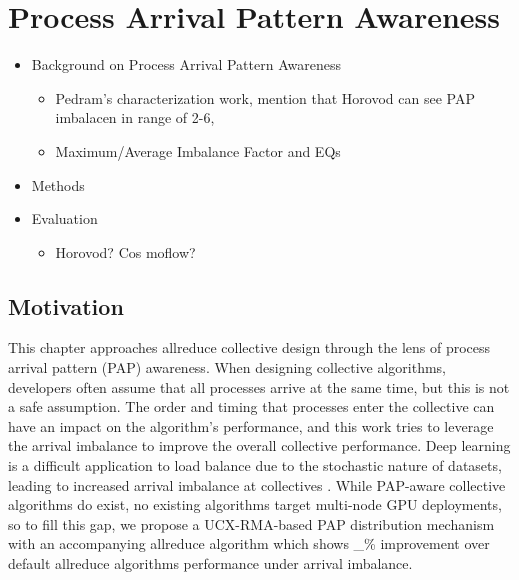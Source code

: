 
\chapter[Process Arrival Pattern Awareness]{Process Arrival Pattern Awareness}\label{ch:PAPAwareness}

\begin{itemize}
    \item Background on Process Arrival Pattern Awareness
    \begin{itemize}
        \item Pedram's characterization work, mention that Horovod can see PAP imbalacen in range of 2-6, \cite{Alizadeh2022PAPCollDL, Mohammadalizadehbakhtevari2021Thesis}
        \item Maximum/Average Imbalance Factor and EQs
    \end{itemize}
    \item Methods
    \item Evaluation
    \begin{itemize}
        \item Horovod? Cos  moflow?
    \end{itemize}
\end{itemize}

\section{Motivation}

This chapter approaches allreduce collective design through the lens of process arrival pattern (PAP) awareness. 
When designing collective algorithms, developers often assume that all processes arrive at the same time, but this is not a safe assumption.
The order and timing that processes enter the collective can have an impact on the algorithm's performance, and this work tries to leverage the arrival imbalance to improve the overall collective performance.
Deep learning is a difficult application to load balance due to the stochastic nature of datasets, leading to increased arrival imbalance at collectives \cite{Mohammadalizadehbakhtevari2021Thesis, Alizadeh2022PAPCollDL, Li2020DLPartialColl}. 
While PAP-aware collective algorithms do exist, no existing algorithms target multi-node GPU deployments, so to fill this gap, we propose a UCX-RMA-based PAP distribution mechanism with an accompanying allreduce algorithm which shows \_\% improvement over default allreduce algorithms performance under arrival imbalance.  


